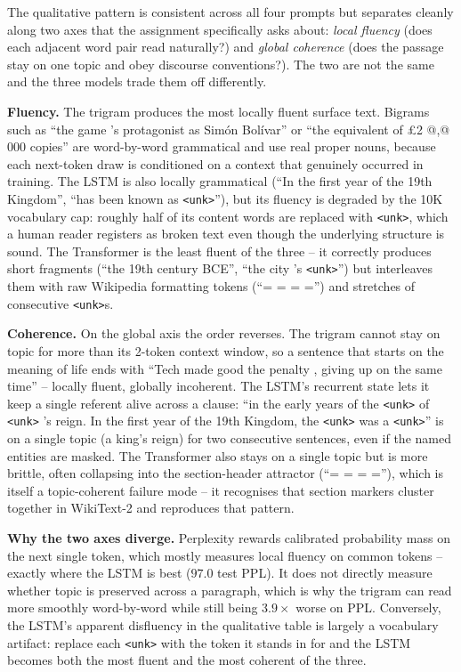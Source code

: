 The qualitative pattern is consistent across all four prompts but separates cleanly along two axes that the assignment specifically asks about: \emph{local fluency} (does each adjacent word pair read naturally?) and \emph{global coherence} (does the passage stay on one topic and obey discourse conventions?). The two are not the same and the three models trade them off differently.

\textbf{Fluency.} The trigram produces the most locally fluent surface text. Bigrams such as ``the game 's protagonist as Sim\'on Bol\'ivar'' or ``the equivalent of \pounds 2 @,@ 000 copies'' are word-by-word grammatical and use real proper nouns, because each next-token draw is conditioned on a context that genuinely occurred in training. The LSTM is also locally grammatical (``In the first year of the 19th Kingdom'', ``has been known as \texttt{<unk>}''), but its fluency is degraded by the 10K vocabulary cap: roughly half of its content words are replaced with \texttt{<unk>}, which a human reader registers as broken text even though the underlying structure is sound. The Transformer is the least fluent of the three -- it correctly produces short fragments (``the 19th century BCE'', ``the city 's \texttt{<unk>}'') but interleaves them with raw Wikipedia formatting tokens (``= = = ='') and stretches of consecutive \texttt{<unk>}s.

\textbf{Coherence.} On the global axis the order reverses. The trigram cannot stay on topic for more than its 2-token context window, so a sentence that starts on the meaning of life ends with ``Tech made good the penalty , giving up on the same time'' -- locally fluent, globally incoherent. The LSTM's recurrent state lets it keep a single referent alive across a clause: ``in the early years of the \texttt{<unk>} of \texttt{<unk>} 's reign. In the first year of the 19th Kingdom, the \texttt{<unk>} was a \texttt{<unk>}'' is on a single topic (a king's reign) for two consecutive sentences, even if the named entities are masked. The Transformer also stays on a single topic but is more brittle, often collapsing into the section-header attractor (``= = = =''), which is itself a topic-coherent failure mode -- it recognises that section markers cluster together in WikiText-2 and reproduces that pattern.

\textbf{Why the two axes diverge.} Perplexity rewards calibrated probability mass on the next single token, which mostly measures local fluency on common tokens -- exactly where the LSTM is best ($97.0$ test PPL). It does not directly measure whether topic is preserved across a paragraph, which is why the trigram can read more smoothly word-by-word while still being $3.9\times$ worse on PPL. Conversely, the LSTM's apparent disfluency in the qualitative table is largely a vocabulary artifact: replace each \texttt{<unk>} with the token it stands in for and the LSTM becomes both the most fluent and the most coherent of the three.

